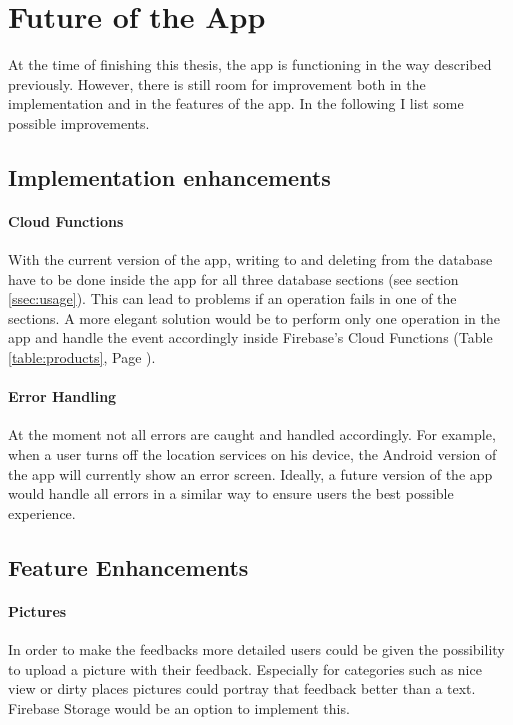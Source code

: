 \section{Future of the App} \label{sec:future}

At the time of finishing this thesis, the app is functioning in the way described previously. However, there is still room for improvement both in the implementation and in the features of the app. In the following I list some possible improvements.

\subsection{Implementation enhancements}
\paragraph{Cloud Functions}
With the current version of the app, writing to and deleting from the database have to be done inside the app for all three database sections (see section \ref{ssec:usage}). This can lead to problems if an operation fails in one of the sections. A more elegant solution would be to perform only one operation in the app and handle the event accordingly inside Firebase's Cloud Functions (Table \ref{table:products}, Page \pageref{table:products}).
\paragraph{Error Handling}
At the moment not all errors are caught and handled accordingly. For example, when a user turns off the location services on his device, the Android version of the app will currently show an error screen. Ideally, a future version of the app would handle all errors in a similar way to ensure users the best possible experience.


\subsection{Feature Enhancements}
\paragraph{Pictures}
In order to make the feedbacks more detailed users could be given the possibility to upload a picture with their feedback. Especially for categories such as nice view or dirty places pictures could portray that feedback better than a text.\\
Firebase Storage would be an option to implement this.
